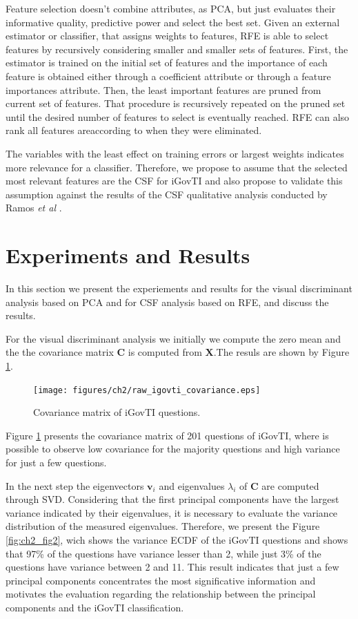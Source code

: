 Feature selection doesn't combine attributes, as PCA, but just evaluates their informative quality, predictive power and select the best set. Given an external estimator or classifier, that assigns weights to features, RFE is able to select features by recursively considering smaller and smaller sets of features. First, the estimator is trained on the initial set of features and the importance of each feature is obtained either through a coefficient attribute or through a feature importances attribute. Then, the least important features are pruned from current set of features. That procedure is recursively repeated on the pruned set until the desired number of features to select is eventually reached. RFE can also rank all features areaccording to when they were eliminated. 

The variables with the least effect on training errors or largest weights indicates more relevance for a classifier. Therefore, we propose to assume that the selected most relevant features are the CSF for iGovTI and also propose to validate this assumption against the results of the CSF qualitative analysis conducted by Ramos \emph{et al} \cite{ramos2016information}.

\section{Experiments and Results}
\label{sec:ch2_experimentalresults}

In this section we present the experiements and results for the visual discriminant analysis based on PCA and for CSF analysis based on RFE, and discuss the results.

For the visual discriminant analysis we initially we compute the zero mean and the the covariance matrix $\mathbf{C}$ is computed from $\mathbf{X}$.The resuls are shown by Figure \ref{fig:ch2_fig1}.
 
\begin{figure}[h!]
     \centering 
     \texttt{[image: figures/ch2/raw\_igovti\_covariance.eps]}
     \caption{Covariance matrix of iGovTI questions.}
     \label{fig:ch2_fig1}
\end{figure}

Figure \ref{fig:ch2_fig1} presents the covariance matrix of 201 questions of iGovTI, where is possible to observe low covariance for the majority questions and high variance for just a few questions. 

In the next step the eigenvectors $\mathbf{v}_i$ and eigenvalues $\lambda_i$ of $\mathbf{C}$ are computed through SVD. Considering that the first principal components have the largest variance indicated by their eigenvalues, it is necessary to evaluate the variance distribution of the measured eigenvalues. Therefore, we present the Figure \ref{fig:ch2_fig2}, wich shows the variance ECDF of the iGovTI questions and shows that 97\% of the questions have variance lesser than 2, while just 3\% of the questions have variance between 2 and 11. This result indicates that just a few principal components concentrates the most significative information and motivates the evaluation regarding the relationship between the principal components and the iGovTI classification.

